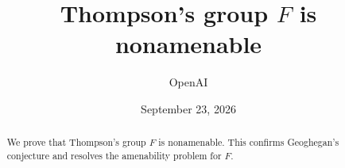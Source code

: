 \documentclass[11pt]{article}
\title{Thompson's group \(F\) is nonamenable}
\author{OpenAI}
\date{September 23, 2026}
\begin{document}
\maketitle
\begin{abstract}
We prove that Thompson's group \(F\) is nonamenable. This confirms
Geoghegan's conjecture and resolves the amenability problem for \(F\).
\end{abstract}





\appendix




\end{document}

